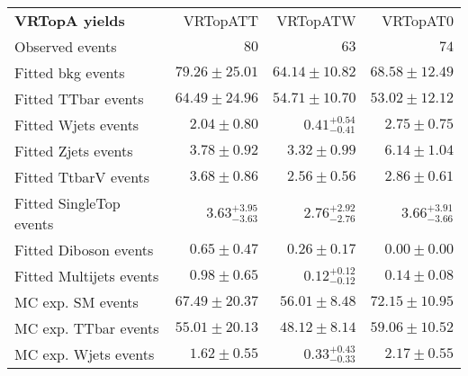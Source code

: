 

\begin{table}
\begin{center}
\setlength{\tabcolsep}{0.0pc}
{\small
\begin{tabular*}{\textwidth}{@{\extracolsep{\fill}}lrrr}
\noalign{\smallskip}\hline\noalign{\smallskip}
{\bf VRTopA yields}           & VRTopATT            & VRTopATW            & VRTopAT0              \\[-0.05cm]
\noalign{\smallskip}\hline\noalign{\smallskip}
Observed events          & $80$              & $63$              & $74$                    \\
\noalign{\smallskip}\hline\noalign{\smallskip}
Fitted bkg events         & $79.26 \pm 25.01$          & $64.14 \pm 10.82$          & $68.58 \pm 12.49$              \\
\noalign{\smallskip}\hline\noalign{\smallskip}
        Fitted TTbar events         & $64.49 \pm 24.96$          & $54.71 \pm 10.70$          & $53.02 \pm 12.12$              \\
        Fitted Wjets events         & $2.04 \pm 0.80$          & $0.41_{-0.41}^{+0.54}$          & $2.75 \pm 0.75$              \\
        Fitted Zjets events         & $3.78 \pm 0.92$          & $3.32 \pm 0.99$          & $6.14 \pm 1.04$              \\
        Fitted TtbarV events         & $3.68 \pm 0.86$          & $2.56 \pm 0.56$          & $2.86 \pm 0.61$              \\
        Fitted SingleTop events         & $3.63_{-3.63}^{+3.95}$          & $2.76_{-2.76}^{+2.92}$          & $3.66_{-3.66}^{+3.91}$              \\
        Fitted Diboson events         & $0.65 \pm 0.47$          & $0.26 \pm 0.17$          & $0.00 \pm 0.00$              \\
        Fitted Multijets events         & $0.98 \pm 0.65$          & $0.12_{-0.12}^{+0.12}$          & $0.14 \pm 0.08$              \\
 \noalign{\smallskip}\hline\noalign{\smallskip}
MC exp. SM events              & $67.49 \pm 20.37$          & $56.01 \pm 8.48$          & $72.15 \pm 10.95$              \\
\noalign{\smallskip}\hline\noalign{\smallskip}
        MC exp. TTbar events         & $55.01 \pm 20.13$          & $48.12 \pm 8.14$          & $59.06 \pm 10.52$              \\
        MC exp. Wjets events         & $1.62 \pm 0.55$          & $0.33_{-0.33}^{+0.43}$          & $2.17 \pm 0.55$              \\

\end{tabular*}}
\end{center}
\end{table}
